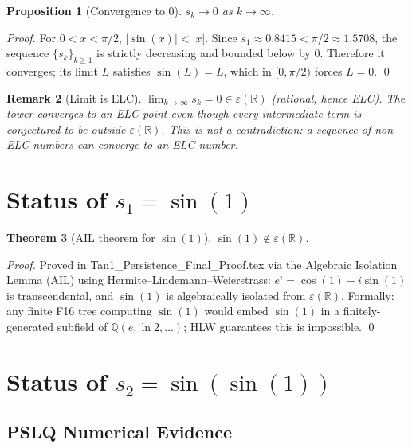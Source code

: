 \documentclass[11pt]{article}
\newtheorem{theorem}{Theorem}
\newtheorem{proposition}[theorem]{Proposition}
\newtheorem{remark}[theorem]{Remark}
\begin{document}
\begin{proposition}[Convergence to 0]
$s_k \to 0$ as $k \to \infty$.
\end{proposition}

\begin{proof}
For $0 < x < \pi/2$, $|\sin(x)| < |x|$. Since $s_1 \approx 0.8415 < \pi/2 \approx 1.5708$,
the sequence $\{s_k\}_{k \geq 1}$ is strictly decreasing and bounded below by 0.
Therefore it converges; its limit $L$ satisfies $\sin(L) = L$, which in $[0, \pi/2)$
forces $L = 0$. \qed
\end{proof}

\begin{remark}[Limit is ELC]
$\lim_{k \to \infty} s_k = 0 \in \varepsilon(\mathbb{R})$ (rational, hence ELC).
The tower converges to an ELC point even though every intermediate term
is conjectured to be outside $\varepsilon(\mathbb{R})$.
This is not a contradiction: a sequence of non-ELC numbers can converge to an ELC number.
\end{remark}

\section{Status of $s_1 = \sin(1)$}

\begin{theorem}[AIL theorem for $\sin(1)$]
\label{thm:s1}
$\sin(1) \notin \varepsilon(\mathbb{R})$.
\end{theorem}

\begin{proof}
Proved in Tan1\_Persistence\_Final\_Proof.tex via the Algebraic Isolation Lemma (AIL)
using Hermite--Lindemann--Weierstrass: $e^i = \cos(1) + i\sin(1)$ is transcendental,
and $\sin(1)$ is algebraically isolated from $\varepsilon(\mathbb{R})$.
Formally: any finite F16 tree computing $\sin(1)$ would embed $\sin(1)$
in a finitely-generated subfield of $\overline{\mathbb{Q}}(e, \ln 2, \ldots)$;
HLW guarantees this is impossible. \qed
\end{proof}

\section{Status of $s_2 = \sin(\sin(1))$}

\subsection{PSLQ Numerical Evidence}
\end{document}
